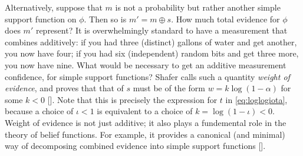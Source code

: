 \begin{example}
Alternatively, suppose that $m$ is not a probability but rather
another simple support function on $\phi$. 
Then so is $m' = m\oplus s$. 
How much total evidence for $\phi$ does $m'$ represent?
It is overwhelmingly standard to have a measurement that combines additively:
if you had three (distinct) gallons of water and get another, you now have four;
if you had six (independent) random bits and get three more, you now have nine. 
What would be necessary to get an additive measurement confidence, 
for simple support functions? 
Shafer calls such a quantity \emph{weight of evidence},
and proves that that of $s$ must be of the form
$w = k \log (1-\alpha)$ for some $k < 0$
[\citeauthor[pg 78]{shafer1976mathematical}]. 
Note that this is precisely the expression for $t$
in \eqref{eq:loglogiota}, 
because a choice of $\iota < 1$
is equivalent to a choice of $k = \log(1-\iota) < 0$.
Weight of evidence is
not just additive;
it also plays a fundemental role in the theory of belief
functions.
For example, it provides a
canonical (and minimal) way of decomposing
combined evidence into simple support functions
[\citeauthor[Theorem 5.5]{shafer1976mathematical}].
\end{example}

